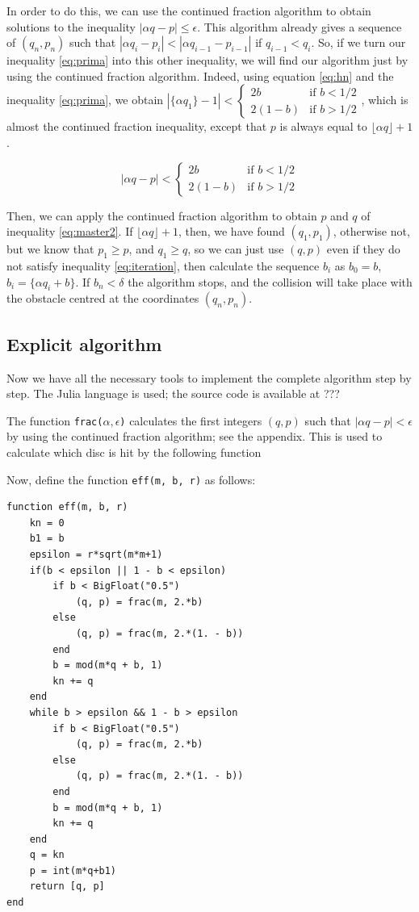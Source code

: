 \documentclass[pre,amsmath,amssymb, twocolumn, showpacs]{revtex4-1}
\begin{document}
In order to do this, we can use the continued fraction algorithm to obtain solutions to the inequality $|\alpha q - p|\leq \epsilon$. This algorithm already gives a sequence of $(q_n,p_n)$ such that $|\alpha q_i - p_i|<|\alpha q_{i-1} - p_{i-1}|$ if $q_{i-1} <q_i$. So, if we turn our inequality \eqref{eq:prima} into this other inequality, we will find our algorithm just by using the continued fraction algorithm.
Indeed, using equation \ref{eq:hn} and the inequality \ref{eq:prima}, we obtain $|\{ \alpha  q_1 \} -1|< \begin{cases} 2b &\mbox{if } b < 1/2 \\  2(1-b) & \mbox{if } b > 1/2 \end{cases} $, which is almost the continued fraction inequality, except that $p$ is always equal to $\lfloor \alpha q  \rfloor+1$. 

\begin{equation}
|\alpha  q-p|< \begin{cases} 2b &\mbox{if } b < 1/2 \\  2(1-b) & \mbox{if } b > 1/2 \end{cases}
\label{eq:master2}
\end{equation}

Then, we can apply the continued fraction algorithm to obtain $p$ and $q$ of inequality \eqref{eq:master2}. If $\lfloor \alpha q  \rfloor+1$, then, we have found $(q_1,p_1)$, otherwise not, but we know that $p_1\geq p$, and $q_1 \geq q$, so we can just use $(q, p)$ even if they do not satisfy inequality \ref{eq:iteration}, then calculate the sequence $b_i$ as $b_0=b$, $b_i=\{\alpha q_i+b\}$. If $b_n<\delta$ the algorithm stops, and the collision will take place with the obstacle centred at the coordinates $(q_n,p_n)$. 

\subsection{Explicit algorithm}

Now we have all the necessary tools to implement the complete algorithm step by step. The Julia language \cite{julialang} is used; the source code is available at ???

The function \texttt{frac($\alpha, \epsilon$)} calculates the first integers $(q,p)$ such that 
$|\alpha q-p|<\epsilon$ by using the continued fraction algorithm; see the appendix. This is used to calculate which disc is hit by the following function

Now, define the function \texttt{eff(m, b, r)} as follows: 
\begin{verbatim}
function eff(m, b, r)
	kn = 0
    b1 = b
    epsilon = r*sqrt(m*m+1) 
    if(b < epsilon || 1 - b < epsilon)
        if b < BigFloat("0.5")
			(q, p) = frac(m, 2.*b)
		else
			(q, p) = frac(m, 2.*(1. - b))
		end
		b = mod(m*q + b, 1)
		kn += q
    end  
	while b > epsilon && 1 - b > epsilon
		if b < BigFloat("0.5")
			(q, p) = frac(m, 2.*b)
		else
			(q, p) = frac(m, 2.*(1. - b))
		end
		b = mod(m*q + b, 1)
		kn += q
	end
	q = kn
    p = int(m*q+b1)
    return [q, p]
end
\end{verbatim}
\end{document}
